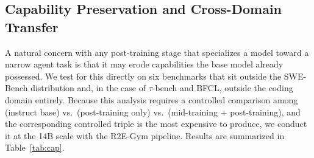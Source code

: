 \subsection{Capability Preservation and Cross-Domain Transfer}
\label{sec:exp:gen}

A natural concern with any post-training stage that specializes a model
toward a narrow agent task is that it may erode capabilities the base
model already possessed. We test for this directly on six benchmarks that
sit outside the SWE-Bench distribution and, in the case of $\tau$-bench
and BFCL, outside the coding domain entirely. Because this analysis
requires a controlled comparison among (instruct base) vs.\ (post-training
only) vs.\ (mid-training $+$ post-training), and the corresponding
controlled triple is the most expensive to produce, we conduct it at the
14B scale with the R2E-Gym pipeline. Results are summarized in
Table~\ref{tab:cap}.

